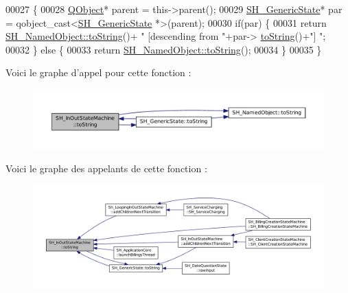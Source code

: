 \begin{DoxyCode}
00027 \{
00028     \hyperlink{classQObject}{QObject}* parent = this->parent();
00029     \hyperlink{classSH__GenericState}{SH\_GenericState}* par = qobject\_cast<\hyperlink{classSH__GenericState}{SH\_GenericState} *>(parent);
00030     \textcolor{keywordflow}{if}(par) \{
00031         \textcolor{keywordflow}{return} \hyperlink{classSH__NamedObject_af73e97f6476ca1ef3a22b159d179f5e7}{SH\_NamedObject::toString}()+ \textcolor{stringliteral}{" [descending from "}+par->
      \hyperlink{classSH__GenericState_a5480c5ee725fd801d8f6292cd4c803b8}{toString}()+\textcolor{stringliteral}{"] "};
00032     \} \textcolor{keywordflow}{else} \{
00033         \textcolor{keywordflow}{return} \hyperlink{classSH__NamedObject_af73e97f6476ca1ef3a22b159d179f5e7}{SH\_NamedObject::toString}();
00034     \}
00035 \}
\end{DoxyCode}


Voici le graphe d'appel pour cette fonction \-:\nopagebreak
\begin{figure}[H]
\begin{center}
\leavevmode
\includegraphics[width=350pt]{classSH__InOutStateMachine_a60ecd7de03d948e2d1e9cbedb5c3e5fa_cgraph}
\end{center}
\end{figure}




Voici le graphe des appelants de cette fonction \-:\nopagebreak
\begin{figure}[H]
\begin{center}
\leavevmode
\includegraphics[width=350pt]{classSH__InOutStateMachine_a60ecd7de03d948e2d1e9cbedb5c3e5fa_icgraph}
\end{center}
\end{figure}


